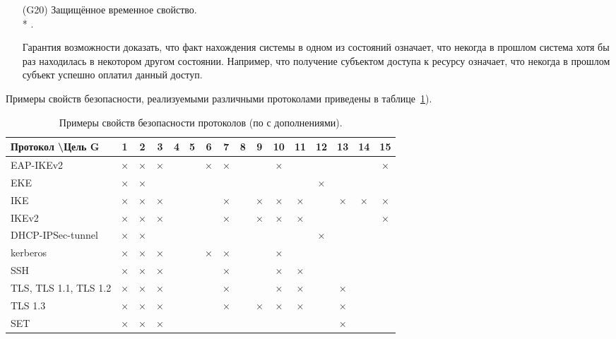 \begin{itemize}
	\item[(G20)] Защищённое временное свойство.\\*
		.
	\item[{}] Гарантия возможности доказать, что факт нахождения системы в одном из состояний означает, что некогда в прошлом система хотя бы раз находилась в некотором другом состоянии. Например, что получение субъектом доступа к ресурсу означает, что некогда в прошлом субъект успешно оплатил данный доступ.

\end{itemize}

Примеры свойств безопасности, реализуемыми различными протоколами приведены в таблице~\ref{tab:protocols-properties}).

\begin{landscape}
{\renewcommand{\arraystretch}{1.5}
\begin{table}
    \centering
    \begin{tabular}{|l|c|c|c|c|c|c|c|c|c|c|c|c|c|c|c|}
        \hline
Протокол \textbackslash Цель G & 1 & 2 & 3 & 4 & 5 & 6 & 7 & 8 & 9 & 10 & 11 & 12 & 13 & 14 & 15 \\
        \hline
        EAP-IKEv2              & × & × & × &   &   & × & × &   &   &  × &    &    &    &    &  × \\
        \hline
        EKE                    & × & × &   &   &   &   &   &   &   &    &    &  × &    &    &    \\
        \hline
        IKE                    & × & × & × &   &   &   & × &   & × &  × &  × &    &  × &  × &  × \\
        \hline
        IKEv2                  & × & × & × &   &   &   & × &   & × &  × &  × &    &    &    &  × \\
        \hline
        DHCP-IPSec-tunnel      & × & × &   &   &   &   &   &   &   &    &    &  × &    &    &    \\
        \hline
        kerberos               & × & × & × &   &   & × & × &   &   &  × &    &    &    &    &    \\
        \hline
        SSH                    & × & × & × &   &   &   & × &   &   &  × &  × &    &    &    &    \\
        \hline
        TLS, TLS 1.1, TLS 1.2  & × & × & × &   &   &   & × &   &   &  × &  × &    &  × &    &    \\
        \hline
        TLS 1.3                & × & × & × &   &   &   & × &   & × &  × &  × &    &  × &    &    \\
        \hline
        SET                    & × & × & × &   &   &   &   &   &   &    &    &    &  × &    &    \\
        \hline
    \end{tabular}
    \caption{Примеры свойств безопасности протоколов (по \cite{Cheremushkin:2009} с дополнениями).}
    \label{tab:protocols-properties}
\end{table}
}
\end{landscape}
